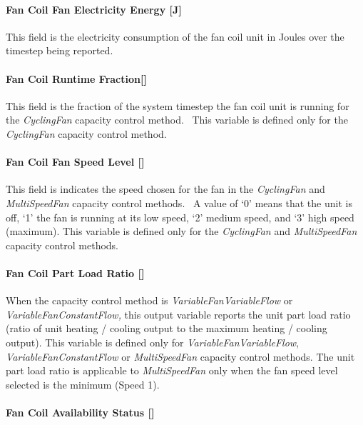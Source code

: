 \paragraph{Fan Coil Fan Electricity Energy {[}J{]}}\label{fan-coil-fan-electric-energy-j}

This field is the electricity consumption of the fan coil unit in Joules over the timestep being reported.

\paragraph{Fan Coil Runtime Fraction{[]}}\label{fan-coil-runtime-fraction}

This field is the fraction of the system timestep the fan coil unit is running for the \emph{CyclingFan} capacity control method.~ This variable is defined only for the \emph{CyclingFan} capacity control method.

\paragraph{Fan Coil Fan Speed Level {[]}}\label{fan-coil-fan-speed-level}

This field is indicates the speed chosen for the fan in the \emph{CyclingFan} and \emph{MultiSpeedFan} capacity control methods.~ A value of `0' means that the unit is off, `1' the fan is running at its low speed, `2' medium speed, and `3' high speed (maximum). This variable is defined only for the \emph{CyclingFan} and \emph{MultiSpeedFan} capacity control methods.

\paragraph{Fan Coil Part Load Ratio {[]}}\label{fan-coil-part-load-ratio}

When the capacity control method is \emph{VariableFanVariableFlow} or \emph{VariableFanConstantFlow,} this output variable reports the unit part load ratio (ratio of unit heating / cooling output to the maximum heating / cooling output). This variable is defined only for \emph{VariableFanVariableFlow}, \emph{VariableFanConstantFlow} or \emph{MultiSpeedFan} capacity control methods. The unit part load ratio is applicable to \emph{MultiSpeedFan} only when the fan speed level selected is the minimum (Speed 1).

\paragraph{Fan Coil Availability Status {[]}}\label{fan-coil-availability-status}

